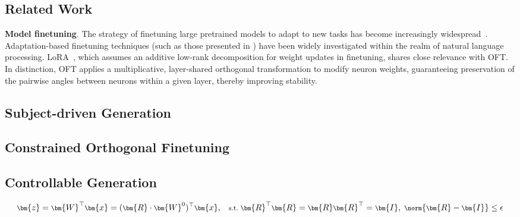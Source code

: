 \begin{itemize}[leftmargin=*,nosep]
\section{Related Work}

\textbf{Model finetuning}. The strategy of finetuning large pretrained models to adapt to new tasks has become increasingly widespread~\cite{devlin2018bert,brown2020language,he2022masked}. Adaptation-based finetuning techniques (such as those presented in \cite{hulora2022,houlsby2019parameter,pfeiffer2020adapterfusion}) have been widely investigated within the realm of natural language processing. LoRA~\cite{hulora2022}, which assumes an additive low-rank decomposition for weight updates in finetuning, shares close relevance with OFT. In distinction, OFT applies a multiplicative, layer-shared orthogonal transformation to modify neuron weights, guaranteeing preservation of the pairwise angles between neurons within a given layer, thereby improving stability.

\subsection{Subject-driven Generation}

\subsection{Constrained Orthogonal Finetuning}

\subsection{Controllable Generation}

\begin{equation}\label{eq:coft_general}
    \footnotesize
    \bm{z}=\bm{W}^\top\bm{x}=(\bm{R}\cdot\bm{W}^0)^\top\bm{x},~~~\text{s.t.}~\bm{R}^\top\bm{R}=\bm{R}\bm{R}^\top=\bm{I},~\norm{\bm{R}-\bm{I}}\leq \epsilon
\end{equation}


\end{itemize}
